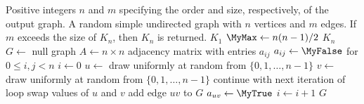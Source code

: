 
\begin{algorithmic}[1]
\Require Positive integers $n$ and $m$ specifying the order and size,
  respectively, of the output graph.
\Ensure A random simple undirected graph with $n$ vertices and $m$
  edges. If $m$ exceeds the size of $K_n$, then $K_n$ is returned.
  \State \Return $K_1$
\EndIf
\State $\MyMax \gets n(n - 1) / 2$
  \State \Return $K_n$
\EndIf
\State $G \gets$ null graph
\State $A \gets n \times n$ adjacency matrix with entries $a_{ij}$
\State $a_{ij} \gets \MyFalse$ for $0 \leq i,j < n$
\State $i \gets 0$
  \State $u \gets$ draw uniformly at random from $\{0, 1, \dots, n-1\}$
  \State $v \gets$ draw uniformly at random from $\{0, 1, \dots, n-1\}$
    \State continue with next iteration of loop
  \EndIf
    \State swap values of $u$ and $v$
  \EndIf
    \State add edge $uv$ to $G$
    \State $a_{uv} \gets \MyTrue$
    \State $i \gets i + 1$
  \EndIf
\EndWhile
\State \Return $G$
\end{algorithmic}
